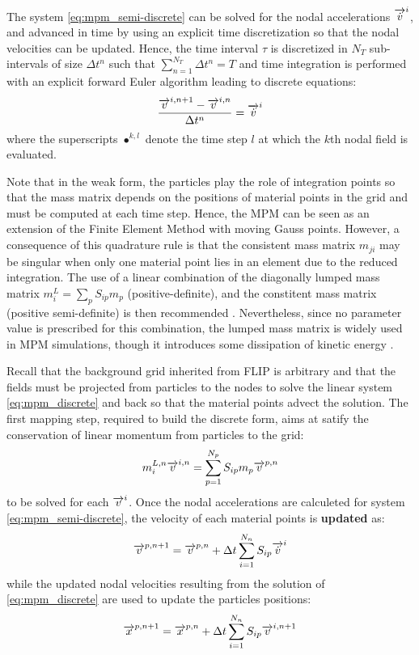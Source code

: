 The system \eqref{eq:mpm_semi-discrete} can be solved for the nodal accelerations ${\overrightarrow{\dot{v}}}^i$, and advanced in time by using an explicit time discretization so that the nodal velocities can be updated. Hence, the time interval $\tau$ is discretized in $N_T$ sub-intervals of size $\Delta t^n$ such that $\sum_{n=1}^{N_T} \Delta t^n = T$ and time integration is performed with an explicit forward Euler algorithm leading to discrete equations:
\begin{equation}
  \label{eq:mpm_discrete}
  \frac{{\overrightarrow{v}}^{i,n+1}-{\overrightarrow{v}}^{i,n}}{\Delta t^n} = {\overrightarrow{\dot{v}}}^i
\end{equation}
where the superscripts $\bullet^{k,l}$ denote the time step $l$ at which the $k$th nodal field is evaluated. 

Note that in the weak form, the particles play the role of integration points so that the mass matrix depends on the positions of material points in the grid and must be computed at each time step. Hence, the MPM can be seen as an extension of the Finite Element Method with moving Gauss points. However, a consequence of this quadrature rule is that the consistent mass matrix $m_{ji}$ may be singular when only one material point lies in an element due to the reduced integration. The use of a linear combination of the diagonally lumped mass matrix $m^L_i=\sum_p S_{ip}m_p$ (positive-definite), and the constitent mass matrix (positive semi-definite) is then recommended \cite{Love}. Nevertheless, since no parameter value is prescribed for this combination, the lumped mass matrix is widely used in MPM simulations, though it introduces some dissipation of kinetic energy \cite{Mass_Flip}.  

Recall that the background grid inherited from FLIP is arbitrary and that the fields must be projected from particles to the nodes to solve the linear system \eqref{eq:mpm_discrete} and back so that the material points advect the solution. The first mapping step, required to build the discrete form,
aims at satify the conservation of linear momentum from particles to the grid:
\begin{equation}
  \label{eq:particles2nodes}
  m^{L,n}_i {\overrightarrow{v}}^{i,n} = \sum_{p=1}^{N_p} S_{ip}m_p {\overrightarrow{v}}^{p,n}
\end{equation}
to be solved for each ${\overrightarrow{v}}^i$. Once the nodal accelerations are calculeted for system \eqref{eq:mpm_semi-discrete}, the velocity of each material points is \textbf{updated} as:
\begin{equation}
  \label{eq:mp_velocity_update}
  {\overrightarrow{v}}^{p,n+1}= {\overrightarrow{v}}^{p,n}+ \Delta t\sum_{i=1}^{N_n} S_{ip}{\overrightarrow{\dot{v}}}^{i}
\end{equation}
while the updated nodal velocities resulting from the solution of \eqref{eq:mpm_discrete} are used to update the particles positions:
\begin{equation}
  \label{eq:position_update}
  {\overrightarrow{x}}^{p,n+1}={\overrightarrow{x}}^{p,n} + \Delta t\sum_{i=1}^{N_n} S_{ip}{\overrightarrow{v}}^{i,n+1} 
\end{equation}

